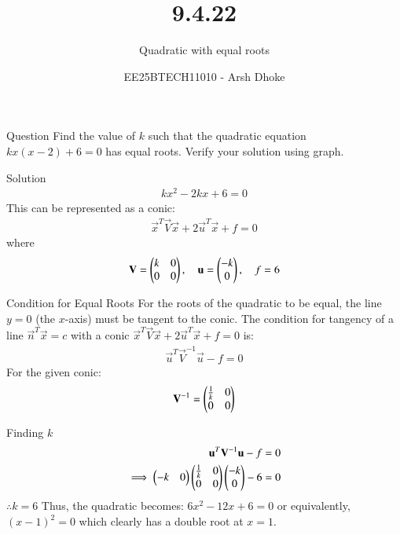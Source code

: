 \documentclass{beamer}
\title{9.4.22}
\subtitle{Quadratic with equal roots}
\author{EE25BTECH11010 - Arsh Dhoke}
\date{}
\begin{document}
\frame{\titlepage}

\begin{frame}{Question}
Find the value of $k$ such that the quadratic equation
$
kx(x-2) + 6 = 0
$
has equal roots. Verify your solution using graph.
\end{frame}

\begin{frame}{Solution}
\begin{align}
kx^2 - 2kx + 6 = 0
\end{align}
This can be represented as a conic:
\begin{align}
\vec{x}^{T}\vec{V}\vec{x} + 2\vec{u}^{T}\vec{x} + f = 0
\end{align}
where
\begin{align}
\mathbf{V} = \begin{pmatrix}k & 0 \\ 0 & 0\end{pmatrix}, \quad
\mathbf{u} = \begin{pmatrix}-k \\ 0\end{pmatrix}, \quad
f = 6
\end{align}
\end{frame}

\begin{frame}{Condition for Equal Roots}
For the roots of the quadratic to be equal, the line $y=0$ (the $x$-axis)
must be tangent to the conic.
The condition for tangency of a line $\vec{n}^{T}\vec{x} = c$ with a conic
$\vec{x}^{T}\vec{V}\vec{x} + 2\vec{u}^{T}\vec{x} + f = 0$ is:
\begin{align}
\vec{u}^{T}\vec{V}^{-1}\vec{u} - f = 0
\end{align}
For the given conic:
\begin{align}
\mathbf{V}^{-1} = \begin{pmatrix}\frac{1}{k} & 0 \\ 0 & 0\end{pmatrix}
\end{align}
\end{frame}

\begin{frame}{Finding $k$}
\begin{align}
\mathbf{u}^{T}\mathbf{V}^{-1}\mathbf{u} - f &= 0 \\
\implies
\begin{pmatrix}-k & 0\end{pmatrix}
\begin{pmatrix}\frac{1}{k} & 0 \\ 0 & 0\end{pmatrix}
\begin{pmatrix}-k \\ 0\end{pmatrix} - 6 &= 0 
\end{align}
$
\therefore k = 6
$
Thus, the quadratic becomes:
$
6x^2 - 12x + 6 = 0
$
or equivalently,
$
(x - 1)^2 = 0
$
which clearly has a double root at $x = 1$.
\end{frame}
\end{document}
